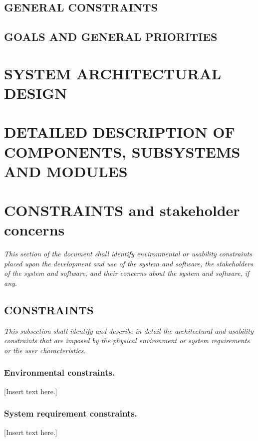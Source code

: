 \documentclass[twoside,letterpaper]{article}
\begin{document}
\subsection{GENERAL CONSTRAINTS}
\subsection{GOALS AND GENERAL PRIORITIES}

\clearpage\pagestyle{Standard}
\section{SYSTEM ARCHITECTURAL DESIGN}
\label{sec:architecture}

\clearpage\pagestyle{Standard}
\section{DETAILED DESCRIPTION OF COMPONENTS, SUBSYSTEMS AND MODULES}
\label{sec:description}


\iffalse
\clearpage\pagestyle{Standard}
\section{CONSTRAINTS and stakeholder concerns}

{\itshape\color{black}
This section of the document shall identify environmental or usability
constraints placed upon the development and use of the system and
software, the stakeholders of the system and software, and their
concerns about the system and software, if any.}

\subsection{CONSTRAINTS}
{\itshape\color{black}
This subsection shall identify and describe in detail the architectural
and usability constraints that are imposed by the physical environment
or system requirements or the user characteristics.}

\subsubsection{Environmental constraints.}
{\color{black}
[Insert text here.] }

\subsubsection{System requirement constraints.}
{\color{black}
[Insert text here.]}
\end{document}
